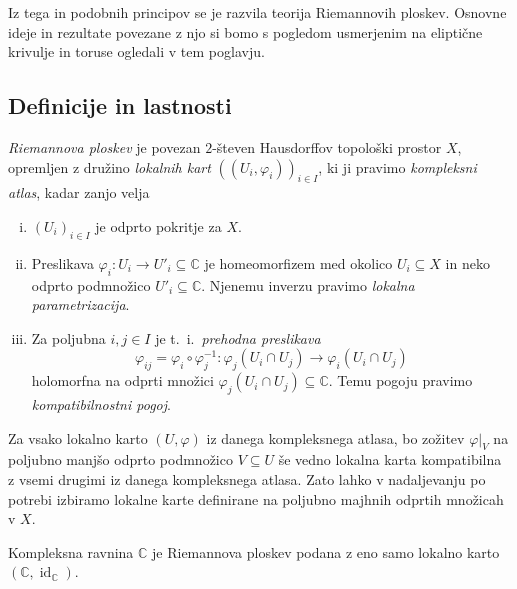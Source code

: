 \documentclass[mat1]{fmfdelo}
\numberwithin{equation}{section}
\newcommand{\C}{\mathbb C}
\newcommand{\inv}{^{-1}}
\newcommand{\ti}{t.~i.\ }
\newcommand{\oz}{oz.\ }
\DeclareMathOperator{\id}{id}
\theoremstyle{definition}
\begin{document}
Iz tega in podobnih principov se je razvila teorija Riemannovih ploskev. Osnovne ideje in rezultate povezane z njo si bomo s pogledom usmerjenim na eliptične krivulje in toruse ogledali v tem poglavju.



\subsection{Definicije in lastnosti}


\begin{definicija}
    \emph{Riemannova ploskev} je povezan $2$-števen Hausdorffov topološki prostor $X$, opremljen z družino \emph{lokalnih kart} $((U_i, \varphi_i))_{i \in I}$, ki ji pravimo \emph{kompleksni atlas}, kadar zanjo velja
    \begin{enumerate}[(i)]
        \item $(U_i)_{i \in I}$ je odprto pokritje za $X$.
        \item Preslikava $\varphi_i : U_i \to U'_i \subseteq \C$ je homeomorfizem med okolico $U_i \subseteq X$ in neko odprto podmnožico $U'_i \subseteq \C$. Njenemu inverzu pravimo \emph{lokalna parametrizacija}.
        \item Za poljubna $i,j \in I$ je \ti \emph{prehodna preslikava}
        \[
            \varphi_{ij} = \varphi_i \circ \varphi_j\inv : \varphi_j(U_i \cap U_j) \longrightarrow  \varphi_i(U_i \cap U_j)   
        \]
        holomorfna na odprti množici $\varphi_j(U_i \cap U_j) \subseteq \C$. Temu pogoju pravimo \emph{kompatibilnostni pogoj}.
    \end{enumerate}
\end{definicija}

\begin{opomba}
    Za vsako lokalno karto $(U, \varphi)$ iz danega kompleksnega atlasa, bo zožitev $\varphi|_V$ na poljubno manjšo odprto podmnožico $V \subseteq U$ še vedno lokalna karta kompatibilna z vsemi drugimi iz danega kompleksnega atlasa. Zato lahko v nadaljevanju po potrebi izbiramo lokalne karte definirane na poljubno majhnih odprtih množicah v $X$. 
\end{opomba}

\begin{primer*}
    Kompleksna ravnina $\C$ je Riemannova ploskev podana z eno samo lokalno karto $(\C, \id_\C)$. 
\end{primer*}
\end{document}
